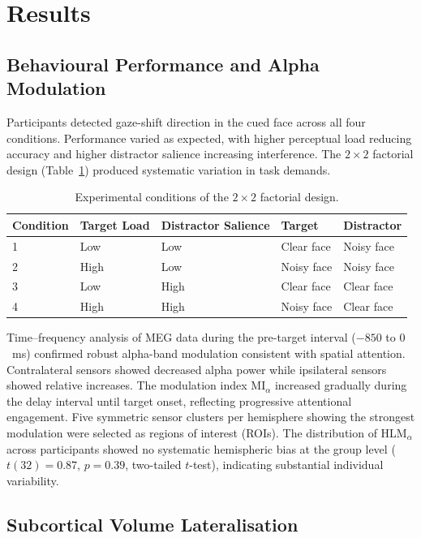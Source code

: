 \documentclass[11pt]{article}
\begin{document}
\section{Results}

\subsection{Behavioural Performance and Alpha Modulation}

Participants detected gaze-shift direction in the cued face across all four conditions. Performance varied as expected, with higher perceptual load reducing accuracy and higher distractor salience increasing interference. The $2 \times 2$ factorial design (Table~\ref{tab:conditions}) produced systematic variation in task demands.

\begin{table}[H]
\centering
\caption{Experimental conditions of the $2 \times 2$ factorial design.}
\label{tab:conditions}
\begin{tabular}{@{}lllll@{}}
\toprule
Condition & Target Load & Distractor Salience & Target & Distractor \\
\midrule
1 & Low & Low & Clear face & Noisy face \\
2 & High & Low & Noisy face & Noisy face \\
3 & Low & High & Clear face & Clear face \\
4 & High & High & Noisy face & Clear face \\
\bottomrule
\end{tabular}
\end{table}

Time--frequency analysis of MEG data during the pre-target interval ($-850$ to $0$~ms) confirmed robust alpha-band modulation consistent with spatial attention. Contralateral sensors showed decreased alpha power while ipsilateral sensors showed relative increases. The modulation index MI$_\alpha$ increased gradually during the delay interval until target onset, reflecting progressive attentional engagement. Five symmetric sensor clusters per hemisphere showing the strongest modulation were selected as regions of interest (ROIs). The distribution of HLM$_\alpha$ across participants showed no systematic hemispheric bias at the group level ($t(32) = 0.87$, $p = 0.39$, two-tailed $t$-test), indicating substantial individual variability.

\subsection{Subcortical Volume Lateralisation}
\end{document}
